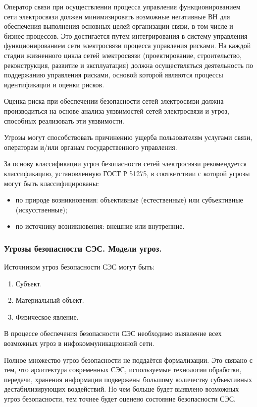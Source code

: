 \documentclass[12pt, russian, oneside, article]{ncc}
\begin{document}
Оператор связи при осуществлении процесса управления функционированием сети электросвязи должен минимизировать возможные негативные ВН для обеспечения выполнения основных целей организации связи, в том числе и бизнес-процессов. Это достигается путем интегрирования в систему управления функционированием сети электросвязи процесса управления рисками. На каждой стадии жизненного цикла сетей электросвязи (проектирование, строительство, реконструкция, развитие и эксплуатация) должна осуществляться деятельность по поддержанию управления рисками, основой которой являются процессы идентификации и оценки рисков. 

Оценка риска при обеспечении безопасности сетей электросвязи должна производиться на основе анализа уязвимостей сетей электросвязи и угроз, способных реализовать эти уязвимости.

Угрозы могут способствовать причинению ущерба пользователям услугами связи, операторам и/или органам государственного управления.

За основу классификации угроз безопасности сетей электросвязи рекомендуется классификацию, установленную ГОСТ Р 51275, в соответствии с которой угрозы могут быть классифицированы:
\begin{itemize}
\item по природе возникновения: объективные (естественные) или субъективные (искусственные);
\item по источнику возникновения: внешние или внутренние.
\end{itemize}
\subsubsection{Угрозы безопасности СЭС. Модели угроз.}
\label{sec-1_1_4}


Источником угроз безопасности СЭС могут быть:
\begin{enumerate}
\item Субъект.
\item Материальный объект.
\item Физическое явление.
\end{enumerate}

В процессе обеспечения безопасности СЭС необходимо выявление всех возможных угроз в инфокоммуникационной сети.

Полное множество угроз безопасности не поддаётся формализации. Это связано с тем, что архитектура современных СЭС, используемые технологии обработки, передачи, хранения информации подвержены большому количеству субъективных дестабилизирующих воздействий. Но чем больше будет выявлено возможных угроз безопасности, тем точнее будет оценено состояние безопасности СЭС.
\end{document}
